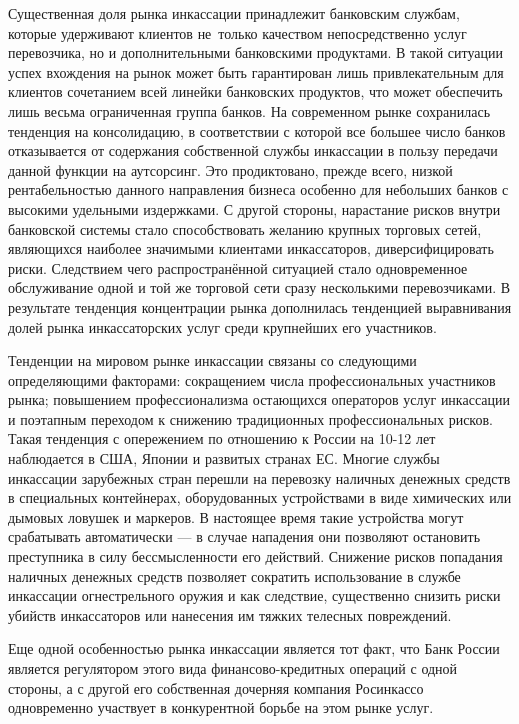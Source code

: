 \documentclass[a4paper,12pt,fleqn]{article} %
\begin{document}
Существенная доля рынка инкассации принадлежит банковским службам, которые удерживают клиентов не~только качеством непосредственно услуг перевозчика, но и дополнительными банковскими продуктами. В такой ситуации успех вхождения на рынок может быть гарантирован лишь привлекательным для клиентов сочетанием всей линейки банковских продуктов, что может обеспечить лишь весьма ограниченная группа банков. На современном рынке сохранилась тенденция на консолидацию, в соответствии с которой все большее число банков отказывается от содержания собственной службы инкассации в пользу передачи данной функции на аутсорсинг. Это продиктовано, прежде всего, низкой рентабельностью данного направления бизнеса особенно для небольших банков с высокими удельными издержками. С другой стороны, нарастание рисков внутри банковской системы стало способствовать желанию крупных торговых сетей, являющихся наиболее значимыми клиентами инкассаторов, диверсифицировать риски. Следствием чего распространённой ситуацией стало одновременное обслуживание одной и той же торговой сети сразу несколькими перевозчиками. В результате тенденция концентрации рынка дополнилась тенденцией выравнивания долей рынка инкассаторских услуг среди крупнейших его участников.

Тенденции на мировом рынке инкассации связаны со следующими  определяющими факторами: сокращением числа профессиональных участников рынка; повышением профессионализма остающихся операторов услуг инкассации и поэтапным переходом к снижению традиционных профессиональных рисков. Такая тенденция с опережением по отношению к России на 10-12 лет наблюдается в США, Японии и развитых странах ЕС. Многие службы инкассации зарубежных стран перешли на перевозку наличных денежных средств в специальных контейнерах, оборудованных устройствами в виде химических или дымовых ловушек и маркеров. В настоящее время такие устройства могут срабатывать автоматически --- в случае нападения они позволяют остановить преступника в силу бессмысленности его действий. Снижение рисков попадания наличных денежных средств позволяет сократить использование в службе инкассации огнестрельного оружия и как следствие, существенно снизить риски убийств инкассаторов или нанесения им тяжких телесных повреждений. 

Еще одной особенностью рынка инкассации является тот факт, что Банк России является регулятором этого вида финансово-кредитных операций с одной стороны, а с другой его собственная дочерняя компания Росинкассо одновременно участвует в конкурентной борьбе на этом рынке услуг.
\end{document}
